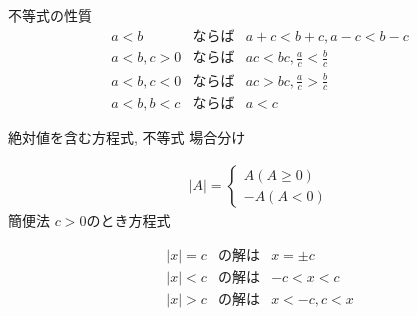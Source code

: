 \documentclass[aspectratio=169, 12pt]{beamer} %
\begin{document}
\begin{frame}{不等式の性質}
    \begin{eqnarray*}
        a<b&ならば&a+c<b+c, a-c<b-c \\
        a<b, c>0&ならば&ac<bc, \frac{a}{c}<\frac{b}{c} \\
        a<b, c<0&ならば&ac>bc, \frac{a}{c}>\frac{b}{c} \\
        a<b, b<c&ならば&a<c
    \end{eqnarray*}
\end{frame}
\begin{frame}{絶対値を含む方程式, 不等式}
    場合分け\par
    \begin{eqnarray*}
        |A|=
        \begin{cases}
            A (A\geq 0) \\
            -A (A < 0)
        \end{cases}
    \end{eqnarray*}
    簡便法 $c>0$のとき方程式 \par
    \begin{eqnarray*}
        |x|=c&の解は&x=\pm c \\
        |x|<c&の解は&-c<x<c \\
        |x|>c&の解は&x<-c, c<x
    \end{eqnarray*}
\end{frame}
\end{document}
